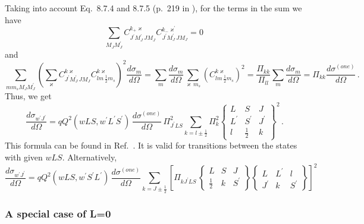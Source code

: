 \documentclass[a4paper,oneside,12pt]{extarticle}
\begin{document}
Taking into account Eq.~8.7.4 and 8.7.5 (p.~219 in \cite{Varshalovich}), for the terms in the sum we have
$$
\sum_{M_J M_J^\prime} 
 C^{k_+ \varkappa}_{J^{\prime} M_J^{\prime} \, J M_J}
 C^{k_- \varkappa^{\prime}}_{J^{\prime} M_J^{\prime} \, J M_J} = 0 \,
$$
and
$$
\sum_{m m_s M_J M_J^\prime} \left( \sum_{\varkappa} C^{k\varkappa}_{J^{\prime} M_J^{\prime} \, J M_J} C^{k\varkappa}_{lm \, \frac{1}{2}m_s} \right)^2 \frac{d \sigma_{m}}{d \Omega} 
= \sum_m \frac{d \sigma_{m}}{d \Omega} \sum_{\varkappa\, m_s} \left( C^{k\varkappa}_{lm \, \frac{1}{2}m_s} \right)^2 =
\frac{\Pi_{kk}}{\Pi_{ll}} \sum_m \frac{d \sigma_{m}}{d \Omega} = \Pi_{kk} \frac{d \sigma^{(one)}}{d \Omega} \,.
$$
Thus, we get
\begin{equation}
\frac{d \sigma_{w^{\prime}J^{\prime}}}{d \Omega} = q Q^2(wLS,w^{\prime}L^{\prime}S^{\prime}) \, \frac{d \sigma^{(one)}}{d \Omega} \,
\Pi^2_{J^{\prime}LS} \sum_{k=l\pm\frac{1}{2}} \Pi^2_{k}
\left \{
\begin{array}{ccc}
L & S & J \\
L^{\prime} & S^{\prime} & J^{\prime} \\
l & \frac{1}{2} & k
\end{array}
\right \}^2 \,.
\label{sigmaNonmagn}
\end{equation}
%
This formula can be found in Ref.~\cite{Cox_1975}. It is valid for transitions between the states with given $wLS$.
Alternatively,
%
\begin{equation}
\frac{d \sigma_{w^{\prime}J^{\prime}}}{d \Omega} = q Q^2(wLS, w^{\prime}S^{\prime}L^{\prime}) \,
\frac{d \sigma^{(one)}}{d \Omega}
\sum_{k=J\pm\frac{1}{2}} \left[ \Pi_{kJ^{\prime}LS} \,
\left \{
\begin{array}{ccc}
L & S & J \\
\frac{1}{2} & k & S^{\prime}
\end{array}
\right \}
\left \{
\begin{array}{ccc}
L & L^{\prime} & l \\
J^{\prime} & k & S^{\prime}
\end{array}
\right \}
\right]^2 
\,
\end{equation}

\subsubsection {A special case of L=0}
\end{document}
